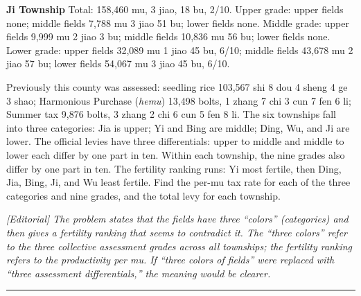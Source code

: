 \documentclass[10pt,a4paper]{article}
\newcommand{\longline}{\par\noindent\rule{\textwidth}{0.4pt}\par}
\newcommand{\EditorialNoteEn}[1]{\par\noindent\textit{[Editorial] #1}\par}
\begin{document}
{\textbf{Ji Township} Total: 158,460 mu, 3 jiao, 18 bu, 2/10. Upper grade: upper fields none; middle fields 7,788 mu 3 jiao 51 bu; lower fields none. Middle grade: upper fields 9,999 mu 2 jiao 3 bu; middle fields 10,836 mu 56 bu; lower fields none. Lower grade: upper fields 32,089 mu 1 jiao 45 bu, 6/10; middle fields 43,678 mu 2 jiao 57 bu; lower fields 54,067 mu 3 jiao 45 bu, 6/10.

Previously this county was assessed: seedling rice 103,567 shi 8 dou 4 sheng 4 ge 3 shao; Harmonious Purchase (\textit{hemu}) 13,498 bolts, 1 zhang 7 chi 3 cun 7 fen 6 li; Summer tax 9,876 bolts, 3 zhang 2 chi 6 cun 5 fen 8 li. The six townships fall into three categories: Jia is upper; Yi and Bing are middle; Ding, Wu, and Ji are lower. The official levies have three differentials: upper to middle and middle to lower each differ by one part in ten. Within each township, the nine grades also differ by one part in ten. The fertility ranking runs: Yi most fertile, then Ding, Jia, Bing, Ji, and Wu least fertile. Find the per-mu tax rate for each of the three categories and nine grades, and the total levy for each township.}

\EditorialNoteEn{The problem states that the fields have three ``colors'' (categories) and then gives a fertility ranking that seems to contradict it. The ``three colors'' refer to the three collective assessment grades across all townships; the fertility ranking refers to the productivity per mu. If ``three colors of fields'' were replaced with ``three assessment differentials,'' the meaning would be clearer.}

\longline
\end{document}
